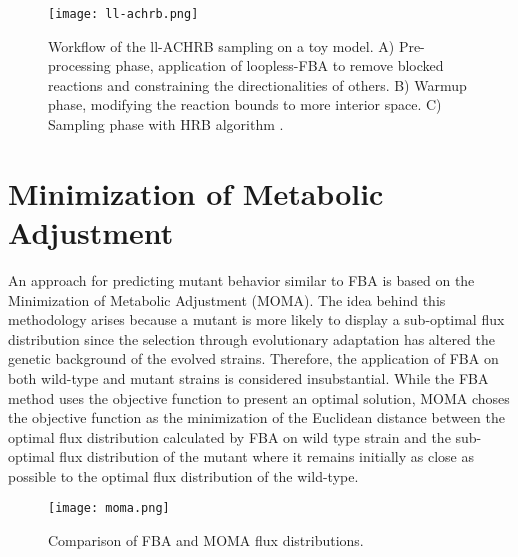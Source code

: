 \begin{figure}[H]
\begin{center}
\texttt{[image: ll-achrb.png]}
\end{center}
\caption[Workflow of the ll-ACHRB sampling on a toy model. A) Pre-processing phase, application of loopless-FBA to remove blocked reactions and constraining the directionalities of others. B) Warmup phase, modifying the reaction bounds to more interior space. C) Sampling phase with HRB algorithm \cite{saa2016ll}.]{Workflow of the ll-ACHRB sampling on a toy model. A) Pre-processing phase, application of loopless-FBA to remove blocked reactions and constraining the directionalities of others. B) Warmup phase, modifying the reaction bounds to more interior space. C) Sampling phase with HRB algorithm \cite{saa2016ll}.}
\label{fig:achrb}
\end{figure}


\section{Minimization of Metabolic Adjustment}
An approach for predicting mutant behavior similar to FBA is based on the Minimization of Metabolic Adjustment (MOMA). The idea behind this methodology arises because a mutant is more likely to display a sub-optimal flux distribution since the selection through evolutionary adaptation has altered the genetic background of the evolved strains. Therefore, the application of FBA on both wild-type and mutant strains is considered insubstantial. While the FBA method uses the objective function to present an optimal solution, MOMA choses the objective function as the minimization of the Euclidean distance between the optimal flux distribution calculated by FBA on wild type strain and the sub-optimal flux distribution of the mutant where it remains initially as close as possible to the optimal flux distribution of the wild-type.

\begin{figure}[H]
\begin{center}
\texttt{[image: moma.png]}
\caption[Comparison of FBA and MOMA flux distributions]{Comparison of FBA and MOMA flux distributions.}
\end{center}
\label{fig:moma}
\end{figure}
\noindent

